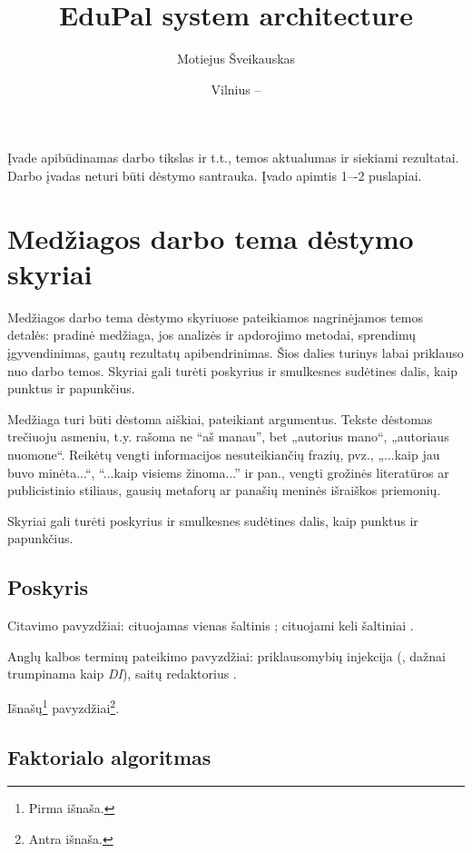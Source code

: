 \documentclass[
    english, %
]{VUMIFPSkursinis}
\title{EduPal system architecture}
\author{Motiejus Šveikauskas}
\date{Vilnius – \the\year}
\begin{document}
\maketitle

\tableofcontents

Įvade apibūdinamas darbo tikslas ir t.t., temos aktualumas ir siekiami rezultatai.
Darbo įvadas neturi būti dėstymo santrauka. Įvado apimtis 1–-2 puslapiai.

\section{Medžiagos darbo tema dėstymo skyriai}
Medžiagos darbo tema dėstymo skyriuose pateikiamos nagrinėjamos temos detalės:
pradinė medžiaga, jos analizės ir apdorojimo metodai, sprendimų įgyvendinimas,
gautų rezultatų apibendrinimas. Šios dalies turinys labai priklauso nuo darbo
temos. Skyriai gali turėti poskyrius ir smulkesnes sudėtines dalis, kaip
punktus ir papunkčius.

Medžiaga turi būti dėstoma aiškiai, pateikiant argumentus. Tekste dėstomas
trečiuoju asmeniu, t.y. rašoma ne \enquote{aš manau}, bet „autorius mano“, „autoriaus
nuomone“. Reikėtų vengti informacijos nesuteikiančių frazių, pvz., „...kaip jau
buvo minėta...“, \enquote{...kaip visiems žinoma...} ir pan., vengti grožinės
literatūros ar publicistinio stiliaus, gausių metaforų ar panašių meninės
išraiškos priemonių.

Skyriai gali turėti poskyrius ir smulkesnes sudėtines dalis, kaip punktus ir
papunkčius.

\subsection{Poskyris}
Citavimo pavyzdžiai: cituojamas vienas šaltinis \cite{PvzStraipsnLt}; cituojami
keli šaltiniai \cite{PvzStraipsnEn, PvzStraipsnLta, PvzKonfLt, PvzKonfEn, PvzKnygLt, PvzKnygEn,
    PvzElPubLt, PvzElPubEn, PvzBakLt, PvzMagistrLt, PvzPhdEn}.

Anglų kalbos terminų pateikimo pavyzdžiai: priklausomybių injekcija (,
dažnai trumpinama kaip \textit{DI}), saitų redaktorius .

Išnašų\footnote{Pirma išnaša.} pavyzdžiai\footnote{Antra išnaša.}.

\subsection{Faktorialo algoritmas}
\end{document}
